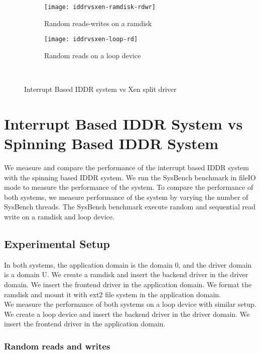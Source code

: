 \begin{figure}[!ht]
  \begin{subfigure}[b]{0.2\textwidth}
  \texttt{[image: iddrvsxen-ramdisk-rdwr]}
  \caption{Random reads-writes on a ramdisk}
  \label{fig:iddrvsxen-ramdisk-rdwr}
  \end{subfigure}
  \hspace{50mm}
  \begin{subfigure}[b]{0.2\textwidth}
  \texttt{[image: iddrvsxen-loop-rd]}
  \caption{Random reads on a loop device}
  \label{fig:iddrvsxen-loop-rd}
  \end{subfigure}\\
\caption{Interrupt Based IDDR system vs Xen split driver}\label{fig:seqloopdisk}
\end{figure}

\section{Interrupt Based IDDR System vs Spinning Based IDDR System}
We measure and compare the performance of the interrupt based IDDR system with the spinning based IDDR system. We run the SysBench benchmark in fileIO mode to measure the performance of the system. To compare the performance of both systems, we measure performance of the system by varying the number of SysBench threads. The SysBench benchmark execute random and sequential read write on a ramdisk and loop device. 
\subsection*{Experimental Setup}
In both systems, the application domain is the domain 0, and the driver domain is a domain U. We create a ramdisk and insert the backend driver in the driver domain. We insert the frontend driver in the application domain. We format the ramdisk and mount it with ext2 file system in the application domain. 
\\[3mm]
We measure the performance of both systems on a loop device with similar setup. We create a loop device and insert the backend driver in the driver domain. We insert the frontend driver in the application domain. %

\subsubsection*{Random reads and writes}

